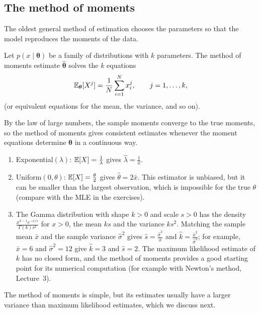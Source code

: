 \subsection{The method of moments}

The oldest general method of estimation chooses the parameters so that the model reproduces the moments of the data.

\begin{definition}\label{L4-def:moments}
    Let $p(x \mid \boldsymbol{\theta})$ be a family of distributions with $k$ parameters. The method of moments estimate $\hat{\boldsymbol{\theta}}$ solves the $k$ equations
    \[\mathbb{E}_{\boldsymbol{\theta}}[X^j] = \frac{1}{N}\sum_{i=1}^N x_i^j, \qquad j = 1, \ldots, k,\]
    (or equivalent equations for the mean, the variance, and so on).
\end{definition}

By the law of large numbers, the sample moments converge to the true moments, so the method of moments gives consistent estimates whenever the moment equations determine $\boldsymbol{\theta}$ in a continuous way.

\begin{example}\label{L4-ex:moments}
    \begin{enumerate}
        \item Exponential$(\lambda)$: $\mathbb{E}[X] = \frac{1}{\lambda}$ gives $\hat\lambda = \frac{1}{\bar x}$.
        \item Uniform$(0, \theta)$: $\mathbb{E}[X] = \frac{\theta}{2}$ gives $\hat\theta = 2\bar x$. This estimator is unbiased, but it can be smaller than the largest observation, which is impossible for the true $\theta$ (compare with the MLE in the exercises).
        \item The Gamma distribution with shape $k > 0$ and scale $s > 0$ has the density $\frac{x^{k-1}e^{-x/s}}{\Gamma(k)s^k}$ for $x > 0$, the mean $ks$ and the variance $ks^2$. Matching the sample mean $\bar x$ and the sample variance $\hat\sigma^2$ gives $\hat s = \frac{\hat\sigma^2}{\bar x}$ and $\hat k = \frac{\bar x^2}{\hat\sigma^2}$; for example, $\bar x = 6$ and $\hat\sigma^2 = 12$ give $\hat k = 3$ and $\hat s = 2$. The maximum likelihood estimate of $k$ has no closed form, and the method of moments provides a good starting point for its numerical computation (for example with Newton's method, Lecture~3).
    \end{enumerate}
\end{example}

The method of moments is simple, but its estimates usually have a larger variance than maximum likelihood estimates, which we discuss next.

